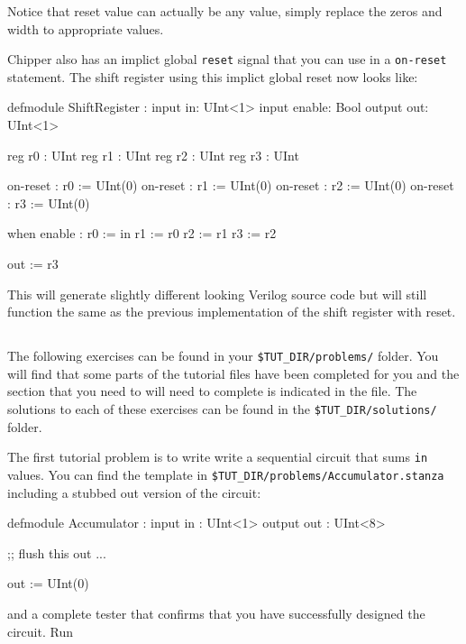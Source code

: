 Notice that reset value can actually be any value, simply replace the zeros and width to appropriate values.

Chipper also has an implict global \verb+reset+ signal that you can use in a \verb+on-reset+ statement. The shift register using this implict global reset now looks like:

\begin{stanza}
defmodule ShiftRegister :
  input  in:     UInt<1>
  input  enable: Bool
  output out:    UInt<1>

  reg r0 : UInt
  reg r1 : UInt
  reg r2 : UInt
  reg r3 : UInt

  on-reset : r0 := UInt(0)
  on-reset : r1 := UInt(0)
  on-reset : r2 := UInt(0)
  on-reset : r3 := UInt(0)

  when enable :
    r0 := in
    r1 := r0
    r2 := r1
    r3 := r2

  out := r3
\end{stanza}

This will generate slightly different looking Verilog source code but will still function the same as the previous implementation of the shift register with reset.


\subsection{}

The following exercises can be found in your \verb+$TUT_DIR/problems/+ folder. You will find that some parts of the tutorial files have been completed for you and the section that you need to will need to complete is indicated in the file. The solutions to each of these exercises can be found in the \verb+$TUT_DIR/solutions/+ folder.

The first tutorial problem is to write write a sequential circuit that sums \verb+in+ values. 
You can find the template in \verb+$TUT_DIR/problems/Accumulator.stanza+ including a stubbed out version of the circuit:
\begin{stanza}
defmodule Accumulator :
  input  in  : UInt<1>
  output out : UInt<8>

  ;; flush this out ...

  out := UInt(0)
\end{stanza}

\noindent
and a complete tester that confirms that you have successfully designed the circuit.  Run 

